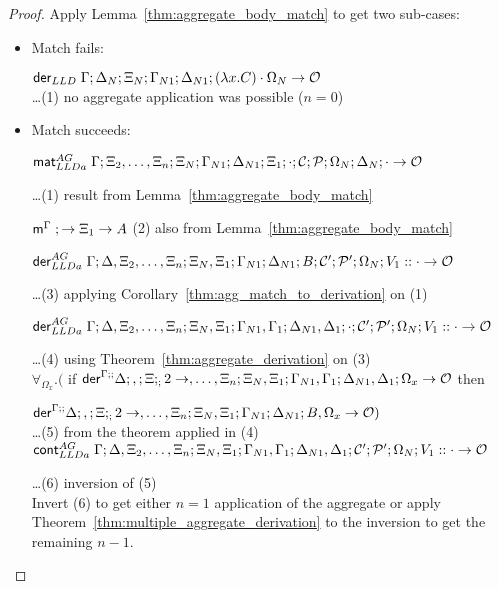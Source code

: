 \begin{proof}
Apply Lemma~\ref{thm:aggregate_body_match} to get two sub-cases:
   
\begin{itemize}[leftmargin=*]
   \item Match fails:
   
   $\mathsf{der}_{LLD} \; \Gamma; \Delta_N; \Xi_N; \Gamma_{N1}; \Delta_{N1}; (\lambda x. C)\cdot \Omega_N
   \rightarrow \mathcal{O}$\\
   \dots \hfill (1) no aggregate application was possible ($n = 0$)\\
   
   \item Match succeeds:
   
   $\mathsf{mat}_{LLDa}^{AG} \; \Gamma; \Xi_2, \dotsc, \Xi_n; \Xi_N; \Gamma_{N1}; \Delta_{N1};
\Xi_1; \cdot; \mathcal{C}; \mathcal{P}; \Omega_N; \Delta_N; \cdot \rightarrow \mathcal{O}$
   
   \dots \hfill (1) result from Lemma~\ref{thm:aggregate_body_match}
   
   $\mathsf{m}^{\Gamma} \; ; \rightarrow \Xi_1 \rightarrow A$
   \hfill (2) also from Lemma~\ref{thm:aggregate_body_match}
   
   $\mathsf{der}_{LLDa}^{AG} \; \Gamma; \Delta, \Xi_2, \dotsc, \Xi_n; \Xi_N, \Xi_1; \Gamma_{N1}; \Delta_{N1}; B; \mathcal{C'};
\mathcal{P'}; \Omega_N; V_1 :: \cdot \rightarrow \mathcal{O}$
   
   \dots \hfill (3) applying Corollary~\ref{thm:agg_match_to_derivation} on (1)
   
   $\mathsf{der}_{LLDa}^{AG} \; \Gamma; \Delta, \Xi_2, \dotsc, \Xi_n; \Xi_N, \Xi_1; \Gamma_{N1}, \Gamma_1; \Delta_{N1}, \Delta_1;
   \cdot; \mathcal{C'}; \mathcal{P'}; \Omega_N; V_1 :: \cdot \rightarrow \mathcal{O}$
   
   \dots \hfill (4) using Theorem~\ref{thm:aggregate_derivation} on (3)\\
   
   $\forall_{\Omega_x}. ($ if $\mathsf{der}^{\Gamma ; ;} \Delta ; ,; \Xi; _; 2 \rightarrow , \dotsc, \Xi_n; \Xi_N,
         \Xi_1; \Gamma_{N1}, \Gamma_1; \Delta_{N1}, \Delta_1; \Omega_x
         \rightarrow \mathcal{O}$ then
   
    \hspace*{0.5cm} $\mathsf{der}^{\Gamma ; ;} \Delta ; ,; \Xi; _; 2 \rightarrow , \dotsc, \Xi_n; \Xi_N, \Xi_1; \Gamma_{N1};
    \Delta_{N1}; B, \Omega_x \rightarrow \mathcal{O})$ \\ \dots \hfill (5)
   from the theorem applied in (4)\\
   
   $\mathsf{cont}_{LLDa}^{AG} \; \Gamma; \Delta, \Xi_2, \dotsc, \Xi_n; \Xi_N, \Xi_1; \Gamma_{N1},
   \Gamma_1; \Delta_{N1}, \Delta_1; \mathcal{C'}; \mathcal{P'}; \Omega_N; V_1 ::
   \cdot \rightarrow \mathcal{O}$
   
   \dots \hfill (6) inversion of (5)\\
   
   Invert (6) to get either $n = 1$ application of the aggregate or apply
   Theorem~\ref{thm:multiple_aggregate_derivation} to the inversion to get the remaining $n-1$. 
\end{itemize}
\end{proof}
\fi
